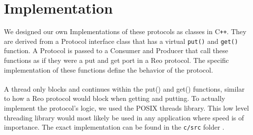 \section{Implementation}

We designed our own Implementations of these protocols as classes in C\texttt{++}.
They are derived from a Protocol interface class that has a virtual \verb|put()| and \verb|get()| function. A Protocol is passed to a Consumer and Producer that call these functions as if they were a put and get port in a Reo protocol. The specific implementation of these functions define the behavior of the protocol.\\\\
%
A thread only blocks and continues within the put() and get() functions, similar to how a Reo protocol would block when getting and putting.
To actually implement the protocol's logic, we used the POSIX threads library\cite{pthreads}. This low level threading library would most likely be used in any application where speed is of importance. The exact implementation can be found in the \verb|c/src| folder \cite{us:git}.
